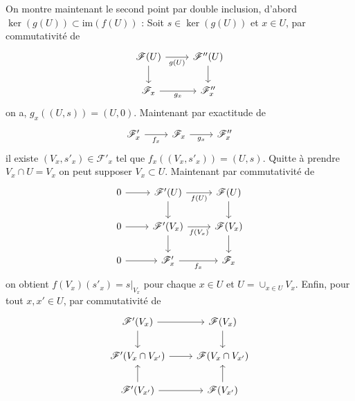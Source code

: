 \documentclass[a4paper,12pt]{article}
\newcommand{\F}{\mathscr F}
\newcommand{\im}{\textrm{im}}
\theoremstyle{plain}
\theoremstyle{definition}
\theoremstyle{remark}
\begin{document}
On montre maintenant le second point par double inclusion, d'abord
$\ker(g(U))\subset \im(f(U))$ : Soit $s\in \ker(g(U))$ et $x\in U$, par
commutativité de 
\[\begin{tikzcd}
	{\F(U)} & {\F''(U)} \\
	{\F_x} & {\F''_x}
	\arrow["{g(U)}"', from=1-1, to=1-2]
	\arrow[from=1-1, to=2-1]
	\arrow[from=1-2, to=2-2]
	\arrow["{g_x}"', from=2-1, to=2-2]
\end{tikzcd}\]
on a, $g_x((U,s))=(U,0)$. Maintenant par exactitude de
\[\begin{tikzcd}
	{\F'_x} & {\F_x} & {\F''_x}
	\arrow["{f_x}"', from=1-1, to=1-2]
	\arrow["{g_x}"', from=1-2, to=1-3]
\end{tikzcd}\]
il existe $(V_x, s'_x)\in \F'_x$ tel que $f_x((V_x,s'_x))=(U,s)$. Quitte
à prendre $V_x\cap U=V_x$ on peut supposer $V_x\subset U$. Maintenant
par commutativité de
\[\begin{tikzcd}
	0 & {\F'(U)} & {\F(U)} \\
	{0 } & {\F'(V_x)} & {\F(V_x)} \\
	0 & {\F'_x} & {\F_x}
	\arrow[from=1-1, to=1-2]
	\arrow["{f(U)}"', from=1-2, to=1-3]
	\arrow[from=1-2, to=2-2]
	\arrow[from=1-3, to=2-3]
	\arrow[from=2-1, to=2-2]
	\arrow["{f(V_x)}"', from=2-2, to=2-3]
	\arrow[from=2-2, to=3-2]
	\arrow[from=2-3, to=3-3]
	\arrow[from=3-1, to=3-2]
	\arrow["{f_x}"', from=3-2, to=3-3]
\end{tikzcd}\]
on obtient $f(V_x)(s'_x)=s|_{V_x}$ pour chaque $x\in U$ et 
$U=\cup_{x\in U} V_x$. Enfin, pour tout $x,x'\in U$, par commutativité
de
\[\begin{tikzcd}
	{\F'(V_x)} & {\F(V_x)} \\
	{\F'(V_x\cap V_{x'})} & {\F(V_x\cap V_{x'})} \\
	{\F'(V_{x'})} & {\F(V_{x'})}
	\arrow[from=1-1, to=1-2]
	\arrow[from=1-1, to=2-1]
	\arrow[from=1-2, to=2-2]
	\arrow[from=2-1, to=2-2]
	\arrow[from=3-1, to=2-1]
	\arrow[from=3-1, to=3-2]
	\arrow[from=3-2, to=2-2]
\end{tikzcd}\]
\end{document}
